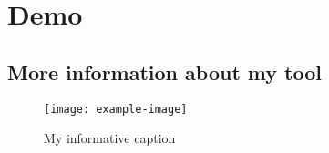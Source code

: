 
\section{Demo}\label{appendix:demo}

    \subsection{More information about my tool}
    
        \begin{figure}[H]
            \centering
            \texttt{[image: example-image]}
            \caption{My informative caption}
            \label{fig:my_super_label}
        \end{figure}
        
